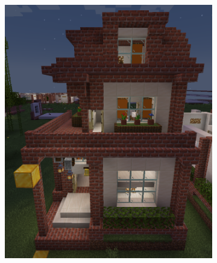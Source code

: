 \documentclass[
oneside,
fontsize=11pt
]{scrartcl}
\begin{document}
\begin{figure}[ht]
  \centering
  \begin{subfigure}[t]{0.3\textwidth}
    \includegraphics[width=\textwidth]{images/interior/entrance-decoration.png}
  \end{subfigure}
  \hfill
  \begin{subfigure}[t]{0.3\textwidth}

\end{subfigure}
\end{figure}
\end{document}

